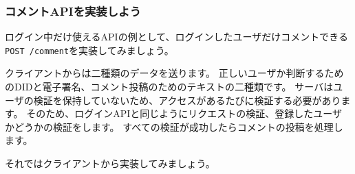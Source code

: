 \subsubsection{コメントAPIを実装しよう}\label{ux30b3ux30e1ux30f3ux30c8apiux3092ux5b9fux88c5ux3057ux3088ux3046}

ログイン中だけ使えるAPIの例として、ログインしたユーザだけコメントできる
\texttt{POST\ /comment}を実装してみましょう。

クライアントからは二種類のデータを送ります。
正しいユーザか判断するためのDIDと電子署名、コメント投稿のためのテキストの二種類です。
サーバはユーザの検証を保持していないため、アクセスがあるたびに検証する必要があります。
そのため、ログインAPIと同じようにリクエストの検証、登録したユーザかどうかの検証をします。
すべての検証が成功したらコメントの投稿を処理します。

それではクライアントから実装してみましょう。

